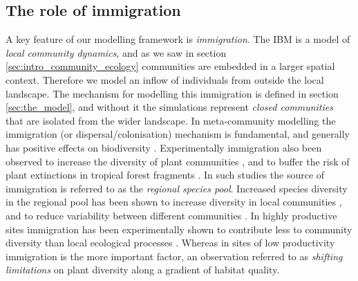\subsection{The role of immigration}
\label{sec:intro_immigration}

A key feature of our modelling framework is \emph{immigration}. The IBM is a model of \emph{local community dynamics}, and as we saw in section \ref{sec:intro_community_ecology} communities are embedded in a larger spatial context. Therefore we model an inflow of individuals from outside the local landscape. The mechanism for modelling this immigration is defined in section \ref{sec:the_model}, and without it the simulations represent \emph{closed communities} that are isolated from the wider landscape. In meta-community modelling the immigration (or dispersal/colonisation) mechanism is fundamental, and generally has positive effects on biodiversity \cite{klausmeier2001habitat,loreau1999immigration,cadotte2006dispersal}. Experimentally immigration also been observed to increase the diversity of plant communities \cite{mouquet2004immigration}, and to buffer the risk of plant extinctions in tropical forest fragments \cite{zartman2006habitat}. In such studies the source of immigration is referred to as the \emph{regional species pool}. Increased species diversity in the regional pool has been shown to increase diversity in local communities \cite{foster2004propagule}, and to reduce variability between different communities \cite{klausmeier2001habitat,ai2012immigration}. In highly productive sites immigration has been experimentally shown to contribute less to community diversity than local ecological processes \cite{foster2004propagule}. Whereas in sites of low productivity immigration is the more important factor, an observation referred to as \emph{shifting limitations} on plant diversity along a gradient of habitat quality.




